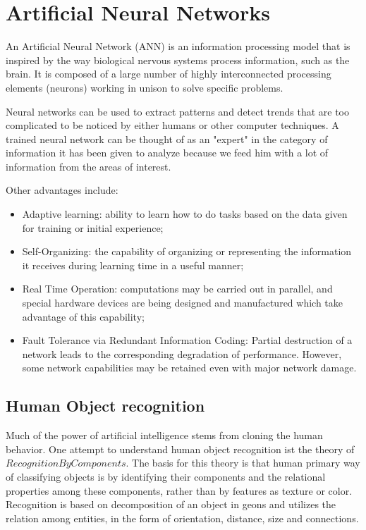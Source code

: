 \documentclass[9pt,shortpaper,twoside,web]{ieeecolor}
\begin{document}
\section{Artificial Neural Networks}
An Artificial Neural Network (ANN) is an information processing model that is inspired by the way  biological nervous systems process information, such as the brain. It is composed of a large number of highly interconnected processing elements (neurons) working in unison to solve specific problems. 

Neural networks can be used to extract patterns and detect trends that are too complicated to be noticed by either humans or other computer techniques. A trained neural network can be thought of as an "expert" in the category of information it has been given to analyze because we feed him with a lot of information from the areas of interest.

Other advantages include:

\begin{itemize}

\item Adaptive learning: ability to learn how to do tasks based on the data  given for training or initial experience;

\item Self-Organizing: the capability of organizing or representing the information it receives during learning time in a useful manner;

\item Real Time Operation: computations may be carried out in parallel, and special hardware devices are being designed and manufactured which take advantage of this capability;

\item Fault Tolerance via Redundant Information Coding: Partial destruction of a network leads to the corresponding degradation of performance. However, some network capabilities may be retained even with major network damage.

\end{itemize}

\subsection{Human Object recognition}
Much of the power of artificial intelligence stems from cloning the human behavior. One attempt to understand human object recognition ist the theory of $Recognition By Components$. The basis for this theory is that human primary way of classifying objects is by identifying their components and the relational properties among these components, rather than by features as texture or color. Recognition is based on decomposition of an object in geons and utilizes the relation among entities, in the form of orientation, distance, size and connections.
\end{document}
